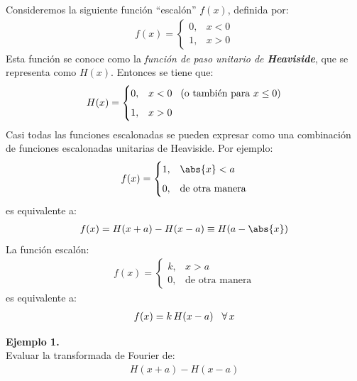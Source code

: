 Consideremos la siguiente función \enquote{escalón} $f(x)$, definida por:
\begin{align*}
f(x) = \begin{cases}
0, & x < 0 \\[0.5em]
1, & x > 0
\end{cases}
\end{align*}
Esta función se conoce como la \emph{función de paso unitario de \textbf{Heaviside}}, que se representa como $H(x)$. Entonces se tiene que:
\begin{align*}
H(x) = \begin{cases}
0, & x < 0 \hspace{0.3cm} (\mbox{o también para } x \leq 0 ) \\[0.5em]
1, & x > 0
\end{cases}
\end{align*}
Casi todas las funciones escalonadas se pueden expresar como una combinación de funciones escalonadas unitarias de Heaviside. Por ejemplo:
\begin{align*}
f(x) = \begin{cases}
1, & \abs{x} < a \\[0.5em]
0, & \mbox{de otra manera}
\end{cases}
\end{align*}
es equivalente a:
\begin{align*}
f(x) = H(x + a) - H(x- a) \equiv H(a - \abs{x})
\end{align*}
La función escalón:
\begin{align*}
f(x) = \begin{cases}
k, & x > a \\[0.5em]
0, & \mbox{de otra manera}
\end{cases}
\end{align*}
es equivalente a:
\begin{align*}
f(x) = k \, H(x - a) \hspace{0.3cm} \forall \, x
\end{align*}
\bigskip

\noindent
\textbf{Ejemplo 1.}
\\
Evaluar la transformada de Fourier de:
\begin{align*}
H(x + a) - H(x - a)
\end{align*}

